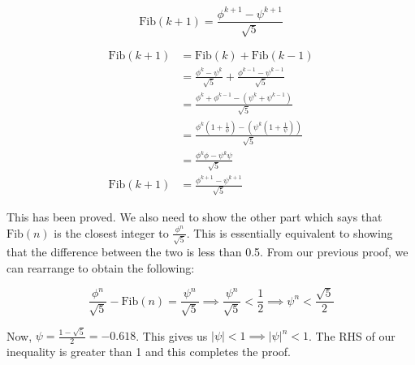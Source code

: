 \documentclass[a4paper]{article}
\begin{document}
	\[\text{Fib}(k+1)=\frac{\phi^{k+1}-\psi^{k+1}}{\sqrt{5}}\]
	
	\[
	\begin{split}
	\text{Fib}(k+1)&=\text{Fib}(k)+\text{Fib}(k-1)\\
	&=\frac{\phi^k-\psi^k}{\sqrt{5}}+\frac{\phi^{k-1}-\psi^{k-1}}{\sqrt{5}}\\
	&=\frac{\phi^k+\phi^{k-1}-(\psi^k+\psi^{k-1})}{\sqrt{5}}\\
	&=\frac{\phi^k\left(1+\frac{1}{\phi}\right)-\left(\psi^k\left(1+\frac{1}{\psi}\right)\right)}{\sqrt{5}}\\
	&=\frac{\phi^k\phi-\psi^k\psi}{\sqrt{5}}\\
	\text{Fib}(k+1)&=\frac{\phi^{k+1}-\psi^{k+1}}{\sqrt{5}}
	\end{split}
	\]
	
	This has been proved. We also need to show the other part which says that $\text{Fib}(n)$ is the closest integer to $\frac{\phi^n}{\sqrt{5}}$. This is essentially equivalent to showing that the difference between the two is less than 0.5. From our previous proof, we can rearrange to obtain the following:
	
	\[\frac{\phi^n}{\sqrt{5}}-\text{Fib}(n)=\frac{\psi^n}{\sqrt{5}}\implies\frac{\psi^n}{\sqrt{5}}<\frac{1}{2}\implies\psi^n<\frac{\sqrt{5}}{2}\]
	
	Now, $\psi=\frac{1-\sqrt{5}}{2}=-0.618$. This gives us $|\psi|<1\implies|\psi|^n<1$. The RHS of our inequality is greater than 1 and this completes the proof.
\end{document}
